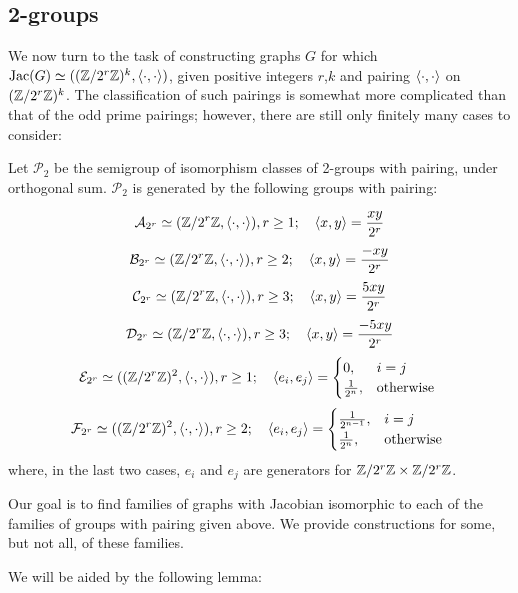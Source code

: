 \documentclass{amsart}
\begin{document}
\subsection{2-groups}

We now turn to the task of constructing graphs $G$ for which $\operatorname{Jac}(G)
\simeq ((\mathbb{Z}/2^r\mathbb{Z})^k, \langle \cdot, \cdot \rangle)$, given positive integers
$r$,$k$ and pairing $\langle \cdot, \cdot \rangle$ on $(\mathbb{Z}/2^r\mathbb{Z})^k$. The
classification of such pairings is somewhat more complicated than that
of the odd prime pairings; however, there are still only finitely many
cases to consider:

\begin{prop}\cite{Miranda1984}
  Let $\mathcal{P}_{2}$ be the semigroup of isomorphism classes of
  2-groups with pairing, under orthogonal sum. $\mathcal{P}_{2}$ is
  generated by the following groups with pairing:

  \[ \mathcal{A}_{2^{r}} \simeq (\mathbb{Z}/2^r\mathbb{Z}, \langle \cdot, \cdot \rangle), r \ge 1; \quad
  \langle x, y \rangle = \frac{xy}{2^r}\]
  \[ \mathcal{B}_{2^{r}} \simeq (\mathbb{Z}/2^r\mathbb{Z}, \langle \cdot, \cdot \rangle), r \ge 2; \quad
  \langle x, y \rangle = \frac{-xy}{2^r}\]
  \[ \mathcal{C}_{2^{r}} \simeq (\mathbb{Z}/2^r\mathbb{Z}, \langle \cdot, \cdot \rangle), r \ge 3; \quad
  \langle x, y \rangle = \frac{5xy}{2^r}\]
  \[ \mathcal{D}_{2^{r}} \simeq (\mathbb{Z}/2^r\mathbb{Z}, \langle \cdot, \cdot \rangle), r \ge 3; \quad
  \langle x, y \rangle = \frac{-5xy}{2^r}\]
  \[ \mathcal{E}_{2^{r}} \simeq ((\mathbb{Z}/2^r\mathbb{Z})^2, \langle \cdot, \cdot \rangle), r \ge 1; \quad
  \langle e_i, e_j \rangle = 
  \begin{cases}
    0, & i = j\\
    \frac{1}{2^{n}}, & \textrm{otherwise }
  \end{cases}
   \]
   \[ \mathcal{F}_{2^{r}} \simeq ((\mathbb{Z}/2^r\mathbb{Z})^2, \langle \cdot, \cdot \rangle), r \ge 2; \quad
   \langle e_i, e_j \rangle = 
   \begin{cases}
     \frac{1}{2^{n-1}}, & i = j\\
     \frac{1}{2^{n}}, & \textrm{otherwise }
   \end{cases}
   \]   
   where, in the last two cases, $e_i$ and $e_j$ are generators for
   $\mathbb{Z}/2^r\mathbb{Z} \times \mathbb{Z}/2^r\mathbb{Z}$. 
 \end{prop}

 Our goal is to find families of graphs with Jacobian isomorphic to
 each of the families of groups with pairing given above. We provide
 constructions for some, but not all, of these families. 

 We will be aided by the following lemma:
\end{document}

